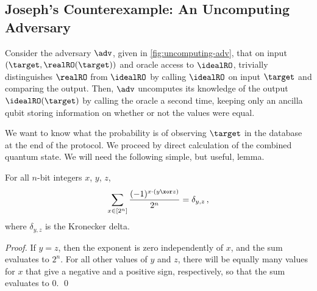   \subsection{Joseph's Counterexample: An Uncomputing Adversary}
    \label{sec:uncompute}
    Consider the adversary $\adv$, given in \autoref{fig:uncomputing-adv}, that
      on input $(\target, \realRO(\target))$ and oracle access to $\idealRO$,
      trivially distinguishes $\realRO$ from $\idealRO$ by calling $\idealRO$
      on input $\target$ and comparing the output. Then, $\adv$ uncomputes its
      knowledge of the output $\idealRO(\target)$ by calling the oracle a
      second time, keeping only an ancilla
      qubit storing information on whether or not the values were equal.

    We want to know what the probability is of observing
      $\target$ in the database at the end of the protocol. We proceed by
      direct calculation of the combined quantum state.
      We will need the following simple, but useful, lemma.

    \begin{lemma}\label{lemma:orthogonality}
      For all $n$-bit integers $x$, $y$, $z$,
      \[
        \sum_{x \in [2^n]} \frac{(-1)^{x \cdot (y \xor z)}}{2^n} = \delta_{y, z}\, ,
      \]
      where $\delta_{y, z}$ is the Kronecker delta.
    \end{lemma}

    \begin{proof}
      If $y = z$, then the exponent is zero independently of $x$, and the sum evaluates to
      $2^n$. For all other values of $y$ and $z$, there will be equally many
      values for $x$ that give a negative and a positive sign, respectively, so that the sum
      evaluates to $0$.
      \qed
    \end{proof}

